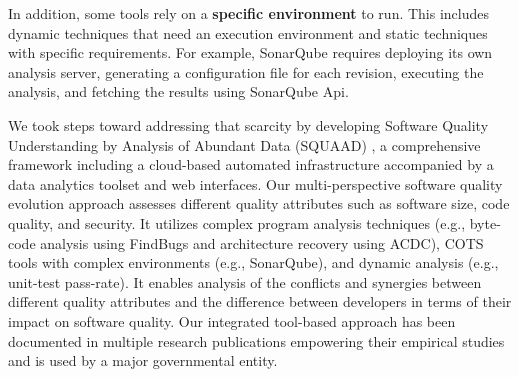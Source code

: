 In addition, some tools rely on a \textbf{specific environment} to run.
This includes dynamic techniques that need an execution environment and static techniques with specific requirements.
For example, SonarQube \cite{campbellsonarqube} requires deploying its own analysis server, generating a configuration file for each revision, executing the analysis, and fetching the results using SonarQube Api.

We took steps toward addressing that scarcity by developing Software Quality Understanding by Analysis of Abundant Data (SQUAAD) \cite{cser2018behnamghader}, a comprehensive framework including a cloud-based automated infrastructure accompanied by a data analytics toolset and web interfaces.
Our multi-perspective software quality evolution approach assesses
different quality attributes such as software size, code quality, and security.
It utilizes complex program analysis techniques (e.g., byte-code analysis using FindBugs and architecture recovery using ACDC), COTS tools with complex environments (e.g., SonarQube), and dynamic analysis (e.g., unit-test pass-rate).
It enables analysis of the conflicts and synergies between different quality attributes and the difference between developers in terms of their impact on software quality.
Our integrated tool-based approach has been documented in multiple research publications \cite{cser2018behnamghader,Behnamghader2018esem,Behnamghader2017qrs,Behnamghader2017,Alfayez2017stc, Alfayez2018TechDebt} empowering their empirical studies and is used by a major governmental entity.


